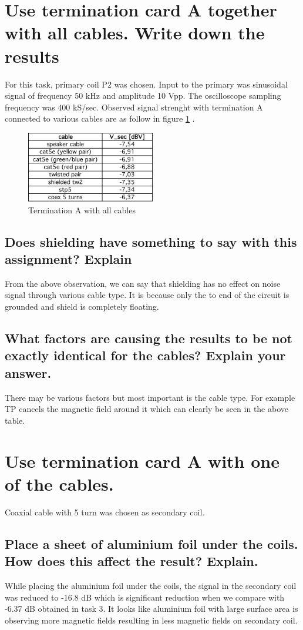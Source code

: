 \documentclass[12pt,a4paper,UKenglish]{article}
\begin{document}
\section{Use termination card A together with all cables. Write down the results}
For this task, primary coil P2 was chosen. Input to the primary was sinusoidal signal of frequency 50 kHz and amplitude 10 Vpp. The oscilloscope sampling frequency was 400 kS/sec. Observed signal strenght with termination A connected to various cables are as follow in figure \ref{fig:task3} .
\begin{figure} [H] %
  \centering 
  \includegraphics[width=0.5\textwidth]{img/task3_data.pdf} 
  \caption{Termination A with all cables}
  \label{fig:task3} 
\end{figure}

\subsection{Does shielding have something to say with this assignment? Explain}
From the above observation, we can say that shielding has no effect on noise signal through various cable type. It is because only the to end of the circuit is grounded and shield is completely floating. 

\subsection{What factors are causing the results to be not exactly identical for the cables? Explain your answer.}
There may be various factors but most important is the cable type. For example TP cancels the magnetic field around it which can clearly be seen in the above table.

\section{Use termination card A with one of the cables.}
Coaxial cable with 5 turn was chosen as secondary coil. 
\subsection{Place a sheet of aluminium foil under the coils. How does this affect the result? Explain.}
While placing the aluminium foil under the coils, the signal in the secondary coil was reduced to -16.8 dB which is significant reduction when we compare with -6.37 dB obtained in task 3. It looks like aluminium foil with large surface area is observing more magnetic fields resulting in less magnetic fields on secondary coil. 
\end{document}
